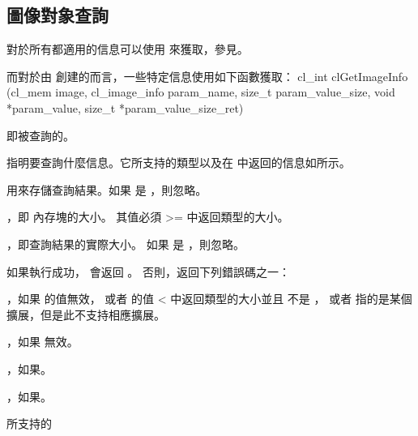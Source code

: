 \subsection{圖像對象查詢}

對於所有都適用的信息可以使用  來獲取，參見。

而對於由  創建的而言，一些特定信息使用如下函數獲取：
\startclc
cl_int clGetImageInfo (cl_mem image,
			cl_image_info param_name,
			size_t param_value_size,
			void *param_value,
			size_t *param_value_size_ret)
\stopclc

 即被查詢的。

 指明要查詢什麼信息。它所支持的類型以及在  中返回的信息如所示。

 用來存儲查詢結果。如果  是 ，則忽略。

，即  內存塊的大小。
其值必須 >= 中返回類型的大小。

，即查詢結果的實際大小。
如果  是 ，則忽略。

如果執行成功，  會返回 。
否則，返回下列錯誤碼之一：
\startigBase
\item {}，如果  的值無效，
或者  的值 < 中返回類型的大小並且  不是 ，
或者  指的是某個擴展，但是此不支持相應擴展。

\item {}，如果  無效。

\item {}，如果\scdevfailres。
\item {}，如果\schostfailres。
\stopigBase

\startbuffer[tblclgetimginfo]
 所支持的 
\stopbuffer

